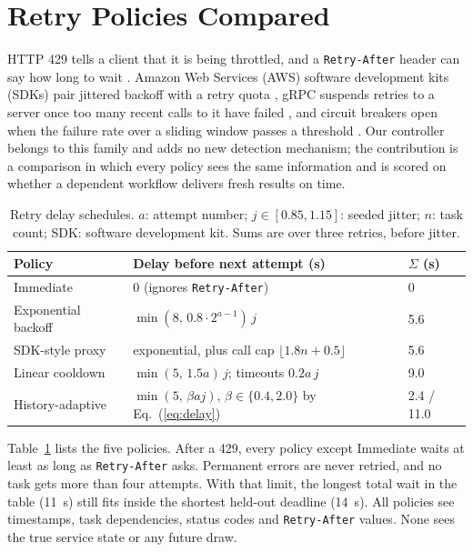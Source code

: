 \documentclass[conference,a4paper]{IEEEtran}
\begin{document}
\section{Retry Policies Compared}
HTTP 429 tells a client that it is being throttled, and a \texttt{Retry-After} header can say how long to wait \cite{rfc6585,rfc9110}. Amazon Web Services (AWS) software development kits (SDKs) pair jittered backoff with a retry quota \cite{awsretry}, gRPC suspends retries to a server once too many recent calls to it have failed \cite{grpc}, and circuit breakers open when the failure rate over a sliding window passes a threshold \cite{resilience4j}. Our controller belongs to this family and adds no new detection mechanism; the contribution is a comparison in which every policy sees the same information and is scored on whether a dependent workflow delivers fresh results on time.

\begin{table}[t]
\centering
\caption{Retry delay schedules. $a$: attempt number; $j\in[0.85,1.15]$: seeded jitter; $n$: task count; SDK: software development kit. Sums are over three retries, before jitter.}
\label{tab:delays}
\scriptsize
\begin{tabular}{@{}lll@{}}\toprule
Policy & Delay before next attempt (s) & $\Sigma$ (s)\\\midrule
Immediate & 0 (ignores \texttt{Retry-After}) & 0\\
Exponential backoff & $\min(8,\,0.8\cdot2^{a-1})\,j$ & 5.6\\
SDK-style proxy & exponential, plus call cap $\lfloor1.8n+0.5\rfloor$ & 5.6\\
Linear cooldown & $\min(5,\,1.5a)\,j$; timeouts $0.2a\,j$ & 9.0\\
History-adaptive & $\min(5,\,\beta a j)$, $\beta\in\{0.4,2.0\}$ by Eq.~(\ref{eq:delay}) & 2.4 / 11.0\\\bottomrule
\end{tabular}
\end{table}

Table~\ref{tab:delays} lists the five policies. After a 429, every policy except Immediate waits at least as long as \texttt{Retry-After} asks. Permanent errors are never retried, and no task gets more than four attempts. With that limit, the longest total wait in the table (11~s) still fits inside the shortest held-out deadline (14~s). All policies see timestamps, task dependencies, status codes and \texttt{Retry-After} values. None sees the true service state or any future draw.
\end{document}
